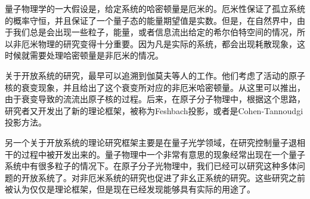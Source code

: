 
量子物理学的一大假设是，给定系统的哈密顿量是厄米的。厄米性保证了孤立系统的概率守恒，并且保证了一个量子态的能量期望值是实数。但是，在自然界中，由于我们总是会出现一些粒子，能量，或者信息流出给定的希尔伯特空间的情况，所以非厄米物理的研究变得十分重要。因为凡是实际的系统，都会出现耗散现象，这时候就需要处理哈密顿量是非厄米的情况。

关于开放系统的研究，最早可以追溯到伽莫夫等人的工作。他们考虑了活动的原子核的衰变现象，并且给出了这个衰变所对应的非厄米哈密顿量。从这里可以推出，由于衰变导致的流流出原子核的过程。后来，在原子分子物理中，根据这个思路，研究者又开发出了新的理论框架，被称为Feshbach投影，或者是Cohen-Tannoudgi投影方法。

另一个关于开放系统的理论研究框架主要是在量子光学领域，在研究控制量子退相干的过程中被开发出来的。量子物理中一个非常有意思的现象经常出现在一个量子系统中有很多粒子的情况下。在原子分子光物理中，我们已经可以研究这种多体问题的开放系统了。对非厄米系统的研究也促进了非幺正系统的研究。这些研究之前被认为仅仅是理论框架，但是现在已经发现能够具有实际的用途了。

